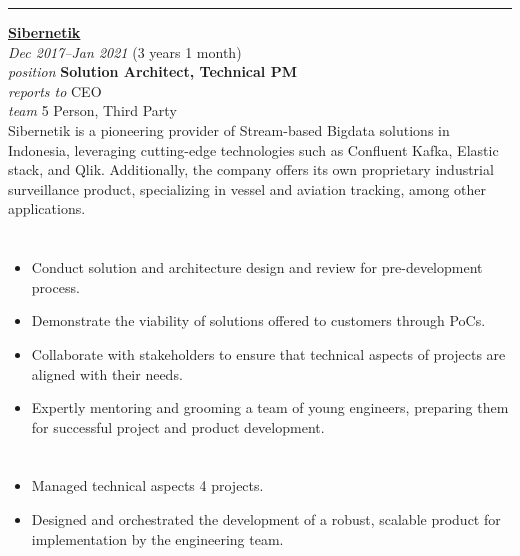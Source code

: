 \documentclass[12pt]{res}
\begin{document}
\begin{resume}
\vspace{10pt}
\rule{1.0\textwidth}{0.1pt}

\begin{multicols}{2}
	{\large {\bf \href{https://sibernetik.co.id}{Sibernetik}}} \\
	{\footnotesize{\sl Dec 2017--Jan 2021} \hfill (3 years 1 month)}\\
	{\footnotesize{\sl position} \hfill \bf{Solution Architect, Technical PM}}\\
	{\footnotesize{\sl reports to} \hfill CEO}\\
	{\footnotesize{\sl team} \hfill 5 Person, Third Party}\\

	\columnbreak
	{\footnotesize{Sibernetik is a pioneering provider of Stream-based Bigdata solutions in Indonesia, leveraging cutting-edge technologies such as Confluent Kafka, Elastic stack, and Qlik. Additionally, the company offers its own proprietary industrial surveillance product, specializing in vessel and aviation tracking, among other applications.}}\\
\end{multicols}
\vspace{-20pt}

\begin{multicols}{2}
	\section{}
		\begin{itemize}
			\item Conduct solution and architecture design and review for pre-development process.
\item Demonstrate the viability of solutions offered to customers through PoCs.
\item Collaborate with stakeholders to ensure that technical aspects of projects are aligned with their needs.
\item Expertly mentoring and grooming a team of young engineers, preparing them for successful project and product development.
		\end{itemize}
	\section{}
		\begin{itemize}
			\setlength{\itemindent}{0pt}
			\item Managed technical aspects 4 projects.
\item Designed and orchestrated the development of a robust, scalable product for implementation by the engineering team.
		\end{itemize}
\end{multicols}


\end{resume}
\end{document}
